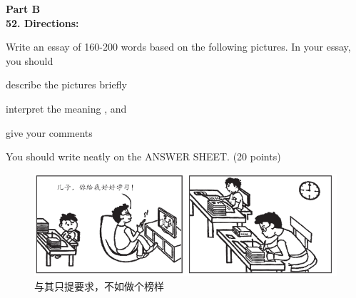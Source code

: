 \vspace{2em}

\noindent
\textbf{Part B}\\
\textbf{ 52. Directions:}

Write an essay of 160-200 words based on the following pictures. In
your essay, you should
\begin{listwrite}
	\item
 describe the pictures briefly

\item 
 interpret the meaning , and

\item 
 give your comments
\end{listwrite}

You should write neatly on the ANSWER SHEET. (20 points)


\begin{figure}[h!]
	\centering
	\includegraphics[width=0.87\linewidth]{picture/2016.png}
	\caption*{与其只提要求，不如做个榜样}
\end{figure}


